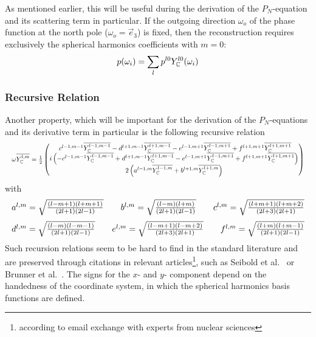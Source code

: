 As mentioned earlier, this will be useful during the derivation of the $P_N$-equation and its scattering term in particular. If the outgoing direction $\omega_o$ of the phase function at the north pole ($\omega_o=\vec{e}_3$) is fixed, then the reconstruction requires exclusively the spherical harmonics coefficients with $m=0$:
\begin{align}
\label{eq:sh_exp_phase}
p(\omega_i) =
\sum_l
{
p^{l0}
Y_{\mathbb{C}}^{l0}(\omega_i)
}
\end{align}

\subsubsection*{Recursive Relation}

Another property, which will be important for the derivation of the $P_N$-equations and its derivative term in particular is the following recursive relation
\begin{equation}
\label{eq:recursive_relation}
\resizebox{1.0\hsize}{!}{$\omega\overline{\SHBC^{l,m}} = \frac{1}{2}
\begin{pmatrix}
\ c^{l-1, m-1}\overline{\SHBC^{l-1,m-1}} - d^{l+1, m-1}\overline{\SHBC^{l+1,m-1}} - e^{l-1, m+1}\overline{\SHBC^{l-1,m+1}} + f^{l+1, m+1}\overline{\SHBC^{l+1,m+1}}\\
i\left(-c^{l-1, m-1}\overline{\SHBC^{l-1,m-1}} + d^{l+1, m-1}\overline{\SHBC^{l+1,m-1}} - e^{l-1, m+1}\overline{\SHBC^{l-1,m+1}} + f^{l+1, m+1}\overline{\SHBC^{l+1,m+1}}\right) \\
2\left(a^{l-1, m}\overline{\SHBC^{l-1,m}}+b^{l+1, m}\overline{\SHBC^{l+1,m}}\right)
\end{pmatrix}$}
\end{equation}
with
\begin{equation*}
\resizebox{1.0\hsize}{!}{$
a^{l,m}= \sqrt{\frac{\left(l-m+1\right)\left(l+m+1\right)}{\left(2l+1\right)\left(2l-1\right)}} \qquad
b^{l,m}= \sqrt{\frac{\left(l-m\right)\left(l+m\right)}{\left(2l+1\right)\left(2l-1\right)}} \qquad
c^{l,m}= \sqrt{\frac{\left(l+m+1\right)\left(l+m+2\right)}{\left(2l+3\right)\left(2l+1\right)}}
$}
\end{equation*}
\begin{equation*}
\resizebox{1.0\hsize}{!}{$
d^{l,m}= \sqrt{\frac{\left(l-m\right)\left(l-m-1\right)}{\left(2l+1\right)\left(2l-1\right)}} \qquad
e^{l,m}= \sqrt{\frac{\left(l-m+1\right)\left(l-m+2\right)}{\left(2l+3\right)\left(2l+1\right)}} \qquad
f^{l,m}= \sqrt{\frac{\left(l+m\right)\left(l+m-1\right)}{\left(2l+1\right)\left(2l-1\right)}}
$}
\end{equation*}
Such recursion relations seem to be hard to find in the standard literature and are preserved through citations in relevant articles\footnote{according to email exchange with experts from nuclear sciences}, such as Seibold et al.~\cite{Seibold14} or Brunner et al.~\cite{Brunner05}. The signs for the $x$- and $y$- component depend on the handedness of the coordinate system, in which the spherical harmonics basis functions are defined.